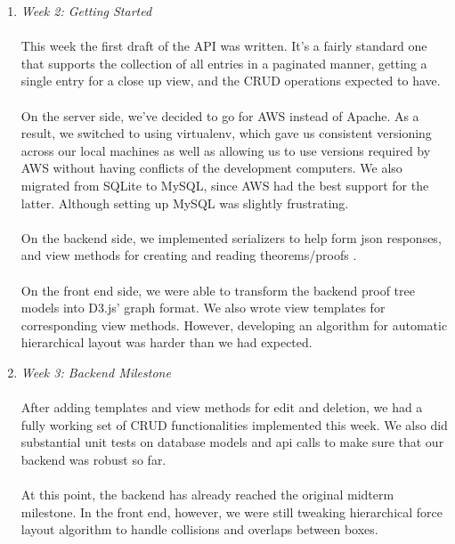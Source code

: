 \documentclass{acm_proc_article-sp}
\begin{document}
\begin{enumerate}
\item \emph{Week 2: Getting Started }\\\\
This week the first draft of the API was written. It's a fairly
standard one that supports the collection of all entries in
a paginated manner, getting a single entry for a close up view,
and the CRUD operations expected to have. \\\\
On the server side, we've decided to go for AWS instead of Apache. As a result, we switched to using virtualenv, which gave us consistent versioning across our local machines as well as allowing us to use versions required by AWS without having conflicts of the development computers. We also migrated from SQLite to MySQL, since AWS had the best support for the latter. Although setting up MySQL was slightly frustrating.\\\\
On the backend side, we implemented serializers to help form json responses, and view methods for creating and reading theorems/proofs .\\\\
On the front end side, we were able to transform the backend proof tree models into D3.js' graph format. We also wrote view templates for corresponding view methods. However, developing an algorithm for automatic hierarchical layout was harder than we had expected.\\

\item \emph{Week 3: Backend Milestone}\\\\
After adding templates and view methods for edit and deletion, we had a fully working set of CRUD functionalities implemented this week. We also did substantial unit tests on database models and api calls to make sure that our backend was robust so far. \\\\
At this point, the backend has already reached the original midterm milestone. In the front end, however, we were still tweaking hierarchical force layout algorithm to handle collisions and overlaps between boxes.\\


\end{enumerate}
\end{document}
